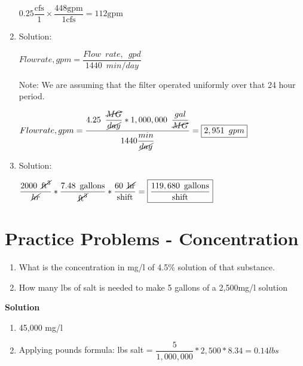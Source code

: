 \begin{enumerate}
\vspace{0.4cm}

$
0.25 \dfrac{\mathrm{cfs}}{1} \times \dfrac{448 \mathrm{gpm}}{1 \mathrm{cfs}}=112 \mathrm{gpm}
$

\vspace{0.4cm}

\item Solution:\\

\vspace{0.2cm}

$Flow rate, gpm=\dfrac{Flow \enspace rate, \enspace gpd}{1440 \enspace min/day}$\\

\vspace{0.2cm}

Note:  We are assuming that the filter operated uniformly over that 24 hour period.\\

\vspace{0.3cm}

$Flow rate, gpm=\dfrac{4.25 \enspace \dfrac{\cancel{MG}}{\cancel{day}} *1,000,000 \enspace \dfrac{gal}{\cancel{MG}}}{1440\dfrac{min}{\cancel{day}}}=\boxed{2,951 \enspace gpm}$


\item Solution:\\

\vspace{0.4cm}

$\dfrac{2000 \enspace \cancel{\mathrm{ft}^3}}{\cancel{hr}}*  \dfrac{7.48 \enspace{\mathrm{gallons}}}{\cancel{\mathrm{ft}^3}}  * \dfrac{60 \enspace \cancel{\mathrm{hr}}}{\mathrm{shift}}   = \boxed{\dfrac{119,680 \enspace \mathrm{gallons}}{\mathrm{shift}}}$

\vspace{0.4cm}
\end{enumerate}


\vspace{1cm}

\section*{Practice Problems - Concentration}
\begin{enumerate}
\item What is the concentration in mg/l of  4.5\% solution of that substance.

\item How many lbs of salt is needed to make 5 gallons of a 2,500mg/l solution

\end{enumerate}
\vspace{0.5cm}
\textbf{Solution}\\
\begin{enumerate}
\item 45,000 mg/l

\item Applying pounds formula:  lbs salt = $\dfrac{5}{1,000,000}*2,500*8.34=\boxed{0.14lbs}$
\end{enumerate}


